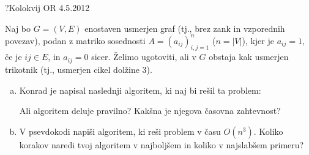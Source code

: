 \begin{naloga}{?}{Kolokvij OR 4.5.2012}
\begin{vprasanje}[usmerjentrikotnik]
Naj bo $G = (V, E)$ enostaven usmerjen graf
(tj., brez zank in vzporednih povezav),
podan z matriko sosednosti $A = (a_{ij})_{i,j=1}^n$ ($n = |V|$),
kjer je $a_{ij} = 1$, če je $ij \in E$, in $a_{ij} = 0$ sicer.
Želimo ugotoviti, ali v $G$ obstaja kak usmerjen trikotnik
(tj., usmerjen cikel dolžine $3$).
\begin{enumerate}[(a)]
\item Konrad je napisal naslednji algoritem, ki naj bi rešil ta problem:
\begin{small}
\begin{algorithmic}
                    \State {}
                \EndIf
            \EndFor
        \EndFor
    \EndFor
\EndFor
\State {}
\end{algorithmic}
\end{small}
Ali algoritem deluje pravilno?
Kakšna je njegova časovna zahtevnost?

\item V psevdokodi napiši algoritem, ki reši problem v času $O(n^3)$.
Koliko korakov naredi tvoj algoritem v najboljšem
in koliko v najslabšem primeru?
\end{enumerate}
\end{vprasanje}
\begin{odgovor}
\end{odgovor}
\end{naloga}


